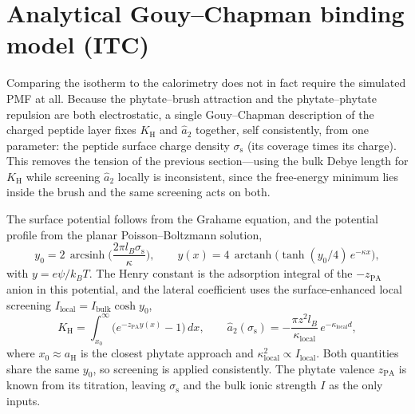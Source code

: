 \documentclass[11pt]{article}
\begin{document}
\section{Analytical Gouy--Chapman binding model (ITC)}

Comparing the isotherm to the calorimetry does not in fact require the simulated
PMF at all.  Because the phytate--brush attraction and the phytate--phytate
repulsion are both electrostatic, a single Gouy--Chapman description of the
charged peptide layer fixes $K_\text{H}$ and $\hat a_2$ together, self
consistently, from one parameter: the peptide surface charge density
$\sigma_\text{s}$ (its coverage times its charge).  This removes the tension of
the previous section---using the bulk Debye length for $K_\text{H}$ while
screening $\hat a_2$ locally is inconsistent, since the free-energy minimum lies
inside the brush and the same screening acts on both.

The surface potential follows from the Grahame equation, and the potential
profile from the planar Poisson--Boltzmann solution,
\begin{equation}\label{eq:grahame}
y_0 = 2\,\operatorname{arcsinh}\!\Big(\frac{2\pi l_B\sigma_\text{s}}{\kappa}\Big),
\qquad
y(x) = 4\,\operatorname{arctanh}\!\big(\tanh(y_0/4)\,e^{-\kappa x}\big),
\end{equation}
with $y=e\psi/k_BT$.  The Henry constant is the adsorption integral of the
$-z_\text{PA}$ anion in this potential, and the lateral coefficient uses the
surface-enhanced local screening $I_\text{local}=I_\text{bulk}\cosh y_0$,
\begin{equation}\label{eq:KHgc}
K_\text{H} = \int_{x_0}^\infty\!\big(e^{-z_\text{PA} y(x)}-1\big)\,dx,
\qquad
\hat a_2(\sigma_\text{s}) = -\frac{\pi z^2 l_B}{\kappa_\text{local}}\,
                            e^{-\kappa_\text{local} d},
\end{equation}
where $x_0\approx a_\text{H}$ is the closest phytate approach and
$\kappa_\text{local}^2\propto I_\text{local}$.  Both quantities share the same
$y_0$, so screening is applied consistently.  The phytate valence $z_\text{PA}$
is known from its titration, leaving $\sigma_\text{s}$ and the bulk ionic
strength $I$ as the only inputs.
\end{document}
